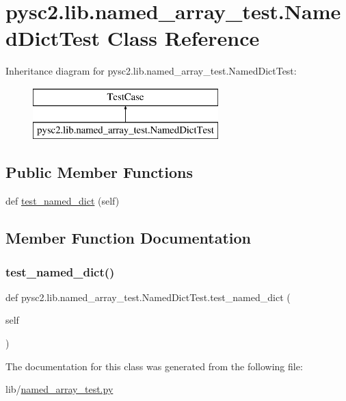 \hypertarget{classpysc2_1_1lib_1_1named__array__test_1_1_named_dict_test}{}\section{pysc2.\+lib.\+named\+\_\+array\+\_\+test.\+Named\+Dict\+Test Class Reference}
\label{classpysc2_1_1lib_1_1named__array__test_1_1_named_dict_test}
Inheritance diagram for pysc2.\+lib.\+named\+\_\+array\+\_\+test.\+Named\+Dict\+Test\+:\begin{figure}[H]
\begin{center}
\leavevmode
\includegraphics[height=2.000000cm]{classpysc2_1_1lib_1_1named__array__test_1_1_named_dict_test}
\end{center}
\end{figure}
\subsection*{Public Member Functions}
\begin{DoxyCompactItemize}
\item 
def \mbox{\hyperlink{classpysc2_1_1lib_1_1named__array__test_1_1_named_dict_test_aa03b1f789100738ff34f6944d56d1c52}{test\+\_\+named\+\_\+dict}} (self)
\end{DoxyCompactItemize}


\subsection{Member Function Documentation}
\mbox{\label{classpysc2_1_1lib_1_1named__array__test_1_1_named_dict_test_aa03b1f789100738ff34f6944d56d1c52}} 
\subsubsection{\texorpdfstring{test\+\_\+named\+\_\+dict()}{test\_named\_dict()}}
{\footnotesize\ttfamily def pysc2.\+lib.\+named\+\_\+array\+\_\+test.\+Named\+Dict\+Test.\+test\+\_\+named\+\_\+dict (\begin{DoxyParamCaption}\item[{}]{self }\end{DoxyParamCaption})}



The documentation for this class was generated from the following file\+:\begin{DoxyCompactItemize}
\item 
lib/\mbox{\hyperlink{named__array__test_8py}{named\+\_\+array\+\_\+test.\+py}}\end{DoxyCompactItemize}
